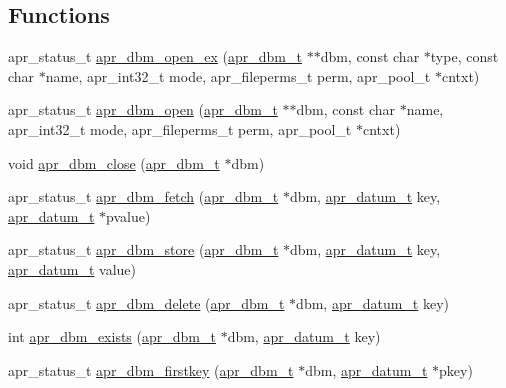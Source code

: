 \subsection*{Functions}
\begin{DoxyCompactItemize}
\item 
apr\-\_\-status\-\_\-t \hyperlink{group___a_p_r___util___d_b_m_gaf7295ba8157f487b78319e168e1344b4}{apr\-\_\-dbm\-\_\-open\-\_\-ex} (\hyperlink{structapr__dbm__t}{apr\-\_\-dbm\-\_\-t} $\ast$$\ast$dbm, const char $\ast$type, const char $\ast$name, apr\-\_\-int32\-\_\-t mode, apr\-\_\-fileperms\-\_\-t perm, apr\-\_\-pool\-\_\-t $\ast$cntxt)
\item 
apr\-\_\-status\-\_\-t \hyperlink{group___a_p_r___util___d_b_m_gab2d9cc87f4922ae11a175556ec66e390}{apr\-\_\-dbm\-\_\-open} (\hyperlink{structapr__dbm__t}{apr\-\_\-dbm\-\_\-t} $\ast$$\ast$dbm, const char $\ast$name, apr\-\_\-int32\-\_\-t mode, apr\-\_\-fileperms\-\_\-t perm, apr\-\_\-pool\-\_\-t $\ast$cntxt)
\item 
void \hyperlink{group___a_p_r___util___d_b_m_gaad1e796c7436bf855ce6ec3c567eb3eb}{apr\-\_\-dbm\-\_\-close} (\hyperlink{structapr__dbm__t}{apr\-\_\-dbm\-\_\-t} $\ast$dbm)
\item 
apr\-\_\-status\-\_\-t \hyperlink{group___a_p_r___util___d_b_m_gac990e695db20e3fa6998089081685196}{apr\-\_\-dbm\-\_\-fetch} (\hyperlink{structapr__dbm__t}{apr\-\_\-dbm\-\_\-t} $\ast$dbm, \hyperlink{structapr__datum__t}{apr\-\_\-datum\-\_\-t} key, \hyperlink{structapr__datum__t}{apr\-\_\-datum\-\_\-t} $\ast$pvalue)
\item 
apr\-\_\-status\-\_\-t \hyperlink{group___a_p_r___util___d_b_m_ga014a6acf6f86aaac5fc44af5b8951051}{apr\-\_\-dbm\-\_\-store} (\hyperlink{structapr__dbm__t}{apr\-\_\-dbm\-\_\-t} $\ast$dbm, \hyperlink{structapr__datum__t}{apr\-\_\-datum\-\_\-t} key, \hyperlink{structapr__datum__t}{apr\-\_\-datum\-\_\-t} value)
\item 
apr\-\_\-status\-\_\-t \hyperlink{group___a_p_r___util___d_b_m_ga3b218881f3bb9f8e909f32d99ae2ad34}{apr\-\_\-dbm\-\_\-delete} (\hyperlink{structapr__dbm__t}{apr\-\_\-dbm\-\_\-t} $\ast$dbm, \hyperlink{structapr__datum__t}{apr\-\_\-datum\-\_\-t} key)
\item 
int \hyperlink{group___a_p_r___util___d_b_m_ga20379004362aeeef11166bdaa8c47d1e}{apr\-\_\-dbm\-\_\-exists} (\hyperlink{structapr__dbm__t}{apr\-\_\-dbm\-\_\-t} $\ast$dbm, \hyperlink{structapr__datum__t}{apr\-\_\-datum\-\_\-t} key)
\item 
apr\-\_\-status\-\_\-t \hyperlink{group___a_p_r___util___d_b_m_gae5428eaa8df9a036212c8fad60e95e3c}{apr\-\_\-dbm\-\_\-firstkey} (\hyperlink{structapr__dbm__t}{apr\-\_\-dbm\-\_\-t} $\ast$dbm, \hyperlink{structapr__datum__t}{apr\-\_\-datum\-\_\-t} $\ast$pkey)

\end{DoxyCompactItemize}
